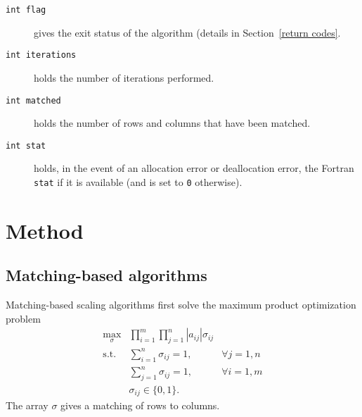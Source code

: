 \begin{description}

\item[\texttt{int flag}] gives the exit status of the algorithm (details in Section~\ref{return codes}.

\item[\texttt{int iterations}] holds the number of iterations performed.

\item[\texttt{int matched}] holds the number of rows and columns that have been matched.

\item[\texttt{int stat}] holds, in the event of an allocation error or deallocation error, the Fortran \texttt{stat} if it is available (and is set to \texttt{0} otherwise).

\end{description}

\section{Method} \label{method}

\subsection{Matching-based algorithms}

Matching-based scaling algorithms first solve the maximum product optimization
problem
\begin{eqnarray*}
   \max_{\sigma} & \prod_{i=1}^m\prod_{j=1}^n |a_{ij}|\sigma_{ij} & \\
   \mathrm{s.t.} & \sum_{i=1}^n\sigma_{ij} = 1, & \forall j=1,n \\
                 & \sum_{j=1}^n\sigma_{ij} = 1, & \forall i=1,m \\
                 & \sigma_{ij} \in \{0,1\}.
\end{eqnarray*}
The array $\sigma$ gives a matching of rows to columns.

